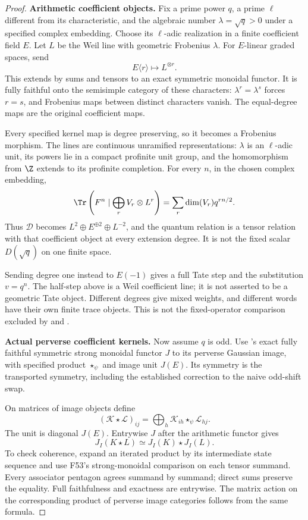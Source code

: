 \begin{proof}
\par\smallskip\noindent\textbf{Arithmetic coefficient objects.}\quad
Fix a prime power $q$, a prime $\ell$ different from its
characteristic, and the algebraic number
$\lambda=\sqrt q>0$ under a specified complex embedding.
Choose its $\ell$-adic realization in a finite
coefficient field $E$.
Let $L$ be the Weil line with geometric Frobenius $\lambda$.
For $E$-linear graded spaces, send
\[
 E\langle r\rangle\longmapsto L^{\otimes r}.
\]
This extends by sums and tensors to an exact symmetric
monoidal functor.
It is fully faithful onto the semisimple category of
these characters: $\lambda^r=\lambda^s$ forces $r=s$,
and Frobenius maps between distinct characters vanish.
The equal-degree maps are the original coefficient maps.

Every specified kernel map is degree preserving,
so it becomes a Frobenius morphism.
The lines are continuous unramified representations:
$\lambda$ is an $\ell$-adic unit, its powers lie in a
compact profinite unit group, and the homomorphism
from $\Z$ extends to its profinite completion.
For every $n$, in the chosen complex embedding,
\begin{equation}\label{eq:gradedcoefficienttrace}
 \Tr\left(F^n\mid\bigoplus_r V_r\otimes L^r\right)
       =\sum_r\dim(V_r)q^{rn/2}.
\end{equation}
Thus $\mathcal D$ becomes
$L^2\oplus E^{\oplus2}\oplus L^{-2}$, and the quantum
relation is a tensor relation with that coefficient object
at every extension degree.
It is not the fixed scalar $D(\sqrt q)$ on one finite space.

Sending degree one instead to $E(-1)$ gives a full
Tate step and the substitution $v=q^n$.
The half-step above is a Weil coefficient line;
it is not asserted to be a geometric Tate object.
Different degrees give mixed weights, and different
words have their own finite trace objects.
This is not the fixed-operator comparison excluded
by  and .

\par\smallskip\noindent\textbf{Actual perverse coefficient kernels.}\quad
Now assume $q$ is odd.
Use 's exact fully faithful symmetric strong
monoidal functor $J$ to its perverse Gaussian image,
with specified product $\star_\psi$ and image unit $J(E)$.
Its symmetry is the transported symmetry, including
the established correction to the naive odd-shift swap.

On matrices of image objects define
\[
 (\mathcal K\star\mathcal L)_{ij}
       =\bigoplus_h\mathcal K_{ih}
                      \star_\psi\mathcal L_{hj}.
\]
The unit is diagonal $J(E)$.
Entrywise $J$ after the arithmetic functor gives
\[
 J_I(K\star L)\simeq J_I(K)\star J_I(L).
\]
To check coherence, expand an iterated product by its
intermediate state sequence and use F53's strong-monoidal
comparison on each tensor summand.
Every associator pentagon agrees summand by summand;
direct sums preserve the equality.
Full faithfulness and exactness are entrywise.
The matrix action on the corresponding product of
perverse image categories follows from the same formula.


\end{proof}
